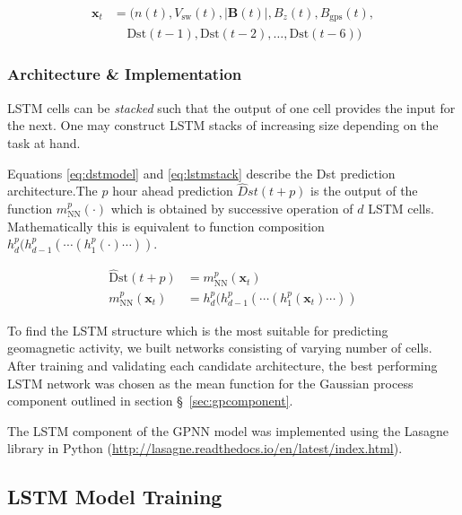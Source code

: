 \begin{equation}\label{eq:lstminputs}
	\begin{aligned}
		\mathbf{x}_t &= (n \left( t \right) , V_{\text{sw}}\left( t \right), 
		|\mathbf{B}\left( t \right)|, B_{z}\left( t \right) , B_{\text{gps}} \left( t \right),\\ 
		& \ \  \ \  \ \text{Dst} \left( t-1 \right), \text{Dst} \left( t-2 \right) , \ldots , 
		\text{Dst} \left( t-6 \right) )
	\end{aligned}
\end{equation}

\subsubsection*{Architecture \& Implementation}

LSTM cells can be \emph{stacked} such that the output of one cell provides the input for the next. 
One may construct LSTM stacks of increasing size depending on the task at hand.  

Equations \ref{eq:dstmodel} and \ref{eq:lstmstack} describe the Dst prediction architecture.The $p$ hour 
ahead prediction $\hat{D}st \left(t + p \right)$ is the output of the function $m^{p}_{\text{NN}}(\cdot)$ which 
is obtained by successive operation of $d$ LSTM cells. Mathematically this is equivalent to function composition 
$h^{p}_{d} ( h^{p}_{d-1}( \cdots (h^{p}_{1}(\cdot)\cdots))$.

\begin{align}
	\hat{\text{D}}\text{st} \left(t + p \right) &= 
	m^{p}_{\text{NN}} (\mathbf{x}_t) \label{eq:dstmodel}\\
	m^{p}_{\text{NN}} (\mathbf{x}_t) &= 
	h^{p}_{d} ( h^{p}_{d-1}( \cdots (h^{p}_{1}(\mathbf{x}_t)\cdots)) \label{eq:lstmstack}
\end{align}

To find the LSTM structure which is the most suitable for predicting geomagnetic activity, we 
built networks consisting of varying number of cells. After training and validating each candidate architecture, the best performing LSTM network was chosen as the mean function for the Gaussian process component outlined in 
section \S~\ref{sec:gpcomponent}.

The LSTM component of the GPNN model was implemented using the Lasagne library in Python 
(\url{http://lasagne.readthedocs.io/en/latest/index.html}). 

\subsection{LSTM Model Training}

